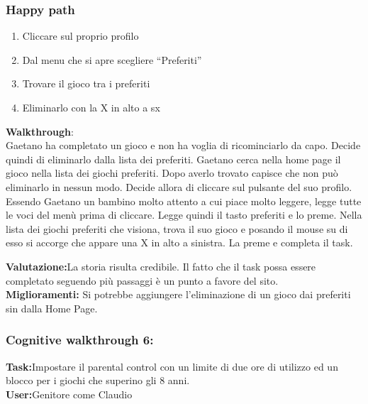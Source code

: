\documentclass[../Report.tex]{subfiles}
\begin{document}
    \subsubsection{Happy path}
    \begin{enumerate}
        \item Cliccare sul proprio profilo
        \item Dal menu che si apre scegliere “Preferiti” 
        \item Trovare il gioco tra i preferiti
        \item Eliminarlo con la X in alto a sx
        
        
    \end{enumerate}
    \textbf{Walkthrough}:\\
    Gaetano ha completato un gioco  e non ha voglia di ricominciarlo da capo. Decide quindi di eliminarlo dalla lista dei preferiti. Gaetano cerca nella home page il gioco nella lista dei giochi preferiti. Dopo averlo trovato capisce che non può eliminarlo in nessun modo. Decide allora di cliccare sul pulsante del suo profilo. Essendo Gaetano un bambino molto attento a cui piace molto leggere, legge tutte le voci del menù prima di cliccare. Legge quindi il tasto preferiti e lo preme. Nella lista dei giochi preferiti che visiona, trova il suo gioco e posando il mouse su di esso si accorge che appare una X in alto a sinistra. La preme e completa il task.

    \textbf{Valutazione:}La storia risulta credibile. Il fatto che il task possa essere completato seguendo più passaggi è un punto a favore del sito.
    \\
    \textbf{Miglioramenti:} Si potrebbe aggiungere l’eliminazione di un gioco dai preferiti sin dalla Home Page.
    
    \subsubsection{Cognitive walkthrough 6:}
    \textbf{Task:}Impostare il parental control con un limite di due ore di utilizzo ed un blocco per i giochi che superino gli 8 anni.    \\
    \textbf{User:}Genitore come Claudio 
\end{document}
